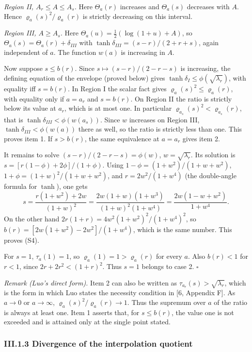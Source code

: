 \documentclass[
  british,
  10pt,
]{article}
\begin{document}
\emph{Region II, \(A_r\le A\le A_s\).} Here \(\Theta_a(r)\) increases
and \(\Theta_a(s)\) decreases with \(A\). Hence
\(\varrho_a(s)^2/\varrho_a(r)\) is strictly decreasing on this interval.

\emph{Region III, \(A\ge A_s\).} Here
\(\Theta_a(u)=\frac12(\log(1+u)+A)\), so
\(\Theta_a(s)=\Theta_a(r)+\delta_{III}\) with
\(\tanh\delta_{III}=(s-r)/(2+r+s)\), again independent of \(a\). The
function \(w(a)\) is increasing in \(A\).

Now suppose \(s\le b(r)\). Since \(s\mapsto(s-r)/(2-r-s)\) is
increasing, the defining equation of the envelope (proved below) gives
\(\tanh\delta_I\le\phi(\sqrt{\lambda_r})\), with equality iff
\(s=b(r)\). In Region I the scalar fact gives
\(\varrho_a(s)^2\le\varrho_a(r)\), with equality only if \(a=a_r\) and
\(s=b(r)\). On Region II the ratio is strictly below its value at
\(a_r\), which is at most one. In particular
\(\varrho_{a_s}(s)^2<\varrho_{a_s}(r)\), that is
\(\tanh\delta_{III}<\phi(w(a_s))\). Since \(w\) increases on Region III,
\(\tanh\delta_{III}<\phi(w(a))\) there as well, so the ratio is strictly
less than one. This proves item 1. If \(s>b(r)\), the same equivalence
at \(a=a_r\) gives item 2.

It remains to solve \((s-r)/(2-r-s)=\phi(w)\), \(w=\sqrt{\lambda_r}\).
Its solution is \(s=[r(1-\phi)+2\phi]/(1+\phi)\). Using
\(1-\phi=(1+w^2)/(1+w+w^2)\), \(1+\phi=(1+w)^2/(1+w+w^2)\), and
\(r=2w^2/(1+w^4)\) (the double-angle formula for \(\tanh\)), one gets \[
s=\frac{r(1+w^2)+2w}{(1+w)^2}
=\frac{2w(1+w)(1+w^3)}{(1+w)^2(1+w^4)}
=\frac{2w(1-w+w^2)}{1+w^4}.
\] On the other hand \(2r(1+r)=4w^2(1+w^2)^2/(1+w^4)^2\), so
\(b(r)=[2w(1+w^2)-2w^2]/(1+w^4)\), which is the same number. This proves
(S4).

For \(s=1\), \(\tau_a(1)=1\), so \(\varrho_a(1)=1>\varrho_a(r)\) for
every \(a\). Also \(b(r)<1\) for \(r<1\), since \(2r+2r^2<(1+r)^2\).
Thus \(s=1\) belongs to case 2. \(\square\)

\emph{Remark (Luo's direct form).} Item 2 can also be written as
\(\tau_{a_r}(s)>\sqrt{\lambda_r}\), which is the form in which Luo
states the necessity condition in {[}6, Appendix F{]}. As \(a\to0\) or
\(a\to\infty\), \(\varrho_a(s)^2/\varrho_a(r)\to1\). Thus the supremum
over \(a\) of the ratio is always at least one. Item 1 asserts that, for
\(s\le b(r)\), the value one is not exceeded and is attained only at the
single point stated.

\subsubsection{III.1.3 Divergence of the interpolation
quotient}\label{iii.1.3-divergence-of-the-interpolation-quotient}
\end{document}

